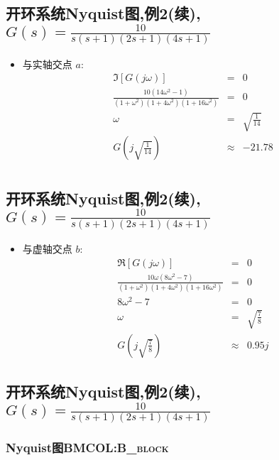 \documentclass[table]{beamer}
\begin{document}
\subsection{开环系统Nyquist图,例2(续),\(G(s)=\frac{10}{s(s+1)(2s+1)(4s+1)}\)}
\label{sec:orgf2d3232}
\begin{itemize}
\item 与实轴交点  \(a\):
\begin{eqnarray*}
\Im[G(j\omega)] & = & 0\\
\frac{10(14\omega^2-1)}{(1+\omega^2)(1+4\omega^2)(1+16\omega^2)} &=&0\\
\omega &=& \sqrt{\frac{1}{14}}\\
G(j\sqrt{\frac{1}{14}}) &\approx& -21.78 \\
\end{eqnarray*}
\end{itemize}
\subsection{开环系统Nyquist图,例2(续),\(G(s)=\frac{10}{s(s+1)(2s+1)(4s+1)}\)}
\label{sec:org85a5a47}
\begin{itemize}
\item 与虚轴交点  \(b\):
\begin{eqnarray*}
\Re[G(j\omega)] & = & 0\\
\frac{10\omega(8\omega^2-7)}{(1+\omega^2)(1+4\omega^2)(1+16\omega^2)} &=&0\\
8\omega^2-7 &=& 0\\
\omega &=& \sqrt{\frac{7}{8}}\\
G(j\sqrt{\frac{7}{8}}) &\approx& 0.95j
\end{eqnarray*}
\end{itemize}
\subsection{开环系统Nyquist图,例2(续),\(G(s)=\frac{10}{s(s+1)(2s+1)(4s+1)}\)}
\label{sec:orge927ea9}
\subsubsection[Nyquist图]{Nyquist图\hfill{}\textsc{BMCOL:B\_block}}
\label{sec:orgfa09cbd}
\end{document}
